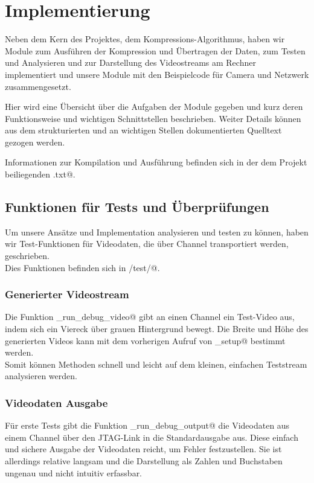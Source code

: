 
\chapter{Implementierung}

Neben dem Kern des Projektes, dem Kompressions-Algorithmus, 
haben wir Module zum Ausführen der Kompression und Übertragen der Daten,
zum Testen und Analysieren und zur Darstellung des Videostreams am Rechner
implementiert und unsere Module mit den Beispielcode für Camera und Netzwerk
zusammengesetzt.

Hier wird eine Übersicht über die Aufgaben der Module gegeben und 
kurz deren Funktionsweise und wichtigen Schnittstellen beschrieben.
Weiter Details können aus dem strukturierten und an wichtigen Stellen
dokumentierten Quelltext gezogen werden.

Informationen zur Kompilation und Ausführung befinden sich in der dem 
Projekt beiliegenden \verb@README.txt@.

\section{Funktionen für Tests und Überprüfungen}
Um unsere Ansätze und Implementation analysieren und testen zu können,
haben wir Test-Funktionen für Videodaten, die über Channel transportiert
werden, geschrieben.
\\Dies Funktionen befinden sich in \verb@board/test/@.

\subsection{Generierter Videostream}
Die Funktion \lstinline@tst_run_debug_video@ gibt an einen Channel ein Test-Video aus,
indem sich ein Viereck über grauen Hintergrund bewegt.
Die Breite und Höhe des generierten Videos kann mit dem vorherigen Aufruf von
\lstinline@tst_setup@ bestimmt werden. 
\\Somit können Methoden schnell und leicht auf dem kleinen, einfachen
Teststream analysieren werden.

\subsection{Videodaten Ausgabe}
Für erste Tests gibt die Funktion \lstinline@tst_run_debug_output@ die
Videodaten aus einem Channel über den JTAG-Link in die Standardausgabe aus.
Diese einfach und sichere Ausgabe der Videodaten reicht, um Fehler
festzustellen. 
Sie ist allerdings relative langsam und die Darstellung als Zahlen und Buchstaben
ungenau und nicht intuitiv erfassbar.

